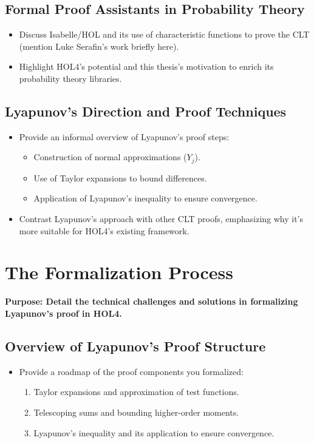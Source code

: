 \subsection{Formal Proof Assistants in Probability Theory}
\begin{itemize}
    \item Discuss Isabelle/HOL and its use of characteristic functions to prove the CLT (mention Luke Serafin’s work briefly here).
    \item Highlight HOL4’s potential and this thesis's motivation to enrich its probability theory libraries.
\end{itemize}

\subsection{Lyapunov’s Direction and Proof Techniques}   
\begin{itemize}
    \item Provide an informal overview of Lyapunov’s proof steps:
    \begin{itemize}
        \item Construction of normal approximations (\( Y_j \)).
        \item Use of Taylor expansions to bound differences.
        \item Application of Lyapunov’s inequality to ensure convergence.
    \end{itemize}
     
   \item Contrast Lyapunov’s approach with other CLT proofs, emphasizing why it’s more suitable for HOL4’s existing framework.
\end{itemize}
   
\section{The Formalization Process}
\textbf{Purpose: Detail the technical challenges and solutions in formalizing Lyapunov’s proof in HOL4.}
\subsection{Overview of Lyapunov’s Proof Structure}
\begin{itemize}
    \item Provide a roadmap of the proof components you formalized:
    \begin{enumerate}
        \item Taylor expansions and approximation of test functions.
        \item Telescoping sums and bounding higher-order moments.
        \item Lyapunov’s inequality and its application to ensure convergence.
    \end{enumerate}
\end{itemize}

